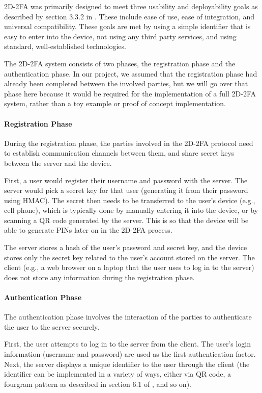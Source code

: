 \documentclass[11pt]{article}
\begin{document}
2D-2FA was primarily designed to meet three usability and deployability
goals as described by section 3.3.2 in \cite{shirvanian2d2fa}. These
include ease of use, ease of integration, and universal compatibility.
These goals are met by using a simple identifier that is easy to enter
into the device, not using any third party services, and using standard,
well-established technologies. 

The 2D-2FA system consists of two phases, the registration phase and the
authentication phase. In our project, we assumed that the registration
phase had already been completed between the involved parties, but we
will go over that phase here because it would be required for the
implementation of a full 2D-2FA system, rather than a toy example or
proof of concept implementation.

\paragraph{Registration Phase}
During the registration phase, the parties involved in the 2D-2FA
protocol need to establish communication channels between them, and
share secret keys between the server and the device. 

First, a user would register their username and password with the
server. The server would pick a secret key for that user (generating it
from their password using HMAC). The secret then needs to be transferred
to the user's device (e.g., cell phone), which is typically done by
manually entering it into the device, or by scanning a QR code generated
by the server. This is so that the device will be able to generate PINs
later on in the 2D-2FA process. 

The server stores a hash of the user's password and secret key, and the
device stores only the secret key related to the user's account stored
on the server. The client (e.g., a web browser on a laptop that the user
uses to log in to the server) does not store any information during the
registration phase. 

\paragraph{Authentication Phase}
The authentication phase involves the interaction of the parties to
authenticate the user to the server securely. 

First, the user attempts to log in to the server from the client. The
user's login information (username and password) are used as the first
authentication factor. Next, the server displays a unique identifier to
the user through the client (the identifier can be implemented in a
variety of ways, either via QR code, a fourgram pattern as described in
section 6.1 of \cite{shirvanian2d2fa}, and so on). 
\end{document}
